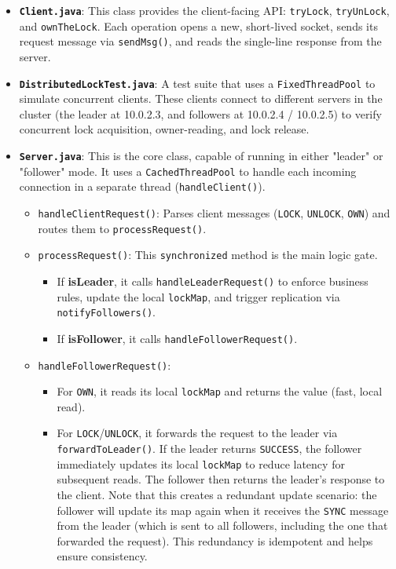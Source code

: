 \documentclass[a4paper,11pt]{article}
\begin{document}
\begin{itemize}
    \item \textbf{\texttt{Client.java}}: This class provides the client-facing API: \texttt{tryLock}, \texttt{tryUnLock}, and \texttt{ownTheLock}. Each operation opens a new, short-lived socket, sends its request message via \texttt{sendMsg()}, and reads the single-line response from the server.

    \item \textbf{\texttt{DistributedLockTest.java}}: A test suite that uses a \texttt{FixedThreadPool} to simulate concurrent clients. These clients connect to different servers in the cluster (the leader at 10.0.2.3, and followers at 10.0.2.4 / 10.0.2.5) to verify concurrent lock acquisition, owner-reading, and lock release.
    
    \item \textbf{\texttt{Server.java}}: This is the core class, capable of running in either "leader" or "follower" mode. It uses a \texttt{CachedThreadPool} to handle each incoming connection in a separate thread (\texttt{handleClient()}).
        \begin{itemize}
            \item \texttt{handleClientRequest()}: Parses client messages (\texttt{LOCK}, \texttt{UNLOCK}, \texttt{OWN}) and routes them to \texttt{processRequest()}.
            \item \texttt{processRequest()}: This \texttt{synchronized} method is the main logic gate.
                \begin{itemize}
                    \item If \textbf{isLeader}, it calls \texttt{handleLeaderRequest()} to enforce business rules, update the local \texttt{lockMap}, and trigger replication via \texttt{notifyFollowers()}.
                    \item If \textbf{isFollower}, it calls \texttt{handleFollowerRequest()}.
                \end{itemize}
            \item \texttt{handleFollowerRequest()}:
                \begin{itemize}
                    \item For \texttt{OWN}, it reads its local \texttt{lockMap} and returns the value (fast, local read).
                    \item For \texttt{LOCK}/\texttt{UNLOCK}, it forwards the request to the leader via \texttt{forwardToLeader()}. If the leader returns \texttt{SUCCESS}, the follower immediately updates its local \texttt{lockMap} to reduce latency for subsequent reads. The follower then returns the leader's response to the client. Note that this creates a redundant update scenario: the follower will update its map again when it receives the \texttt{SYNC} message from the leader (which is sent to all followers, including the one that forwarded the request). This redundancy is idempotent and helps ensure consistency.

\end{itemize}
\end{itemize}
\end{itemize}
\end{document}
